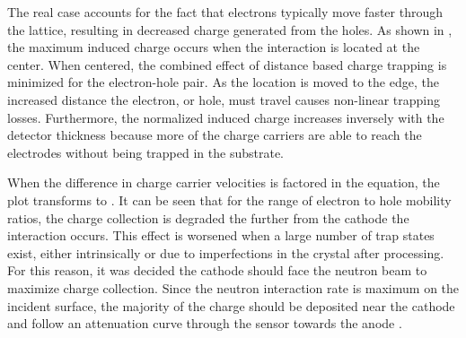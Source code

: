\documentclass[../../../main.tex]{subfiles}
\begin{document}
    The real case accounts for the fact that electrons typically move faster through the lattice, resulting in decreased charge generated from the holes. 
    As shown in , the maximum induced charge occurs when the interaction is located at the center.
    When centered, the combined effect of distance based charge trapping is minimized for the electron-hole pair.
    As the location is moved to the edge, the increased distance the electron, or hole, must travel causes non-linear trapping losses.
    Furthermore, the normalized induced charge increases inversely with the detector thickness because more of the charge carriers are able to reach the electrodes without being trapped in the substrate.
    \par%
    When the difference in charge carrier velocities is factored in the equation, the plot transforms to .
    It can be seen that for the range of electron to hole mobility ratios, the charge collection is degraded the further from the cathode the interaction occurs.
    This effect is worsened when a large number of trap states exist, either intrinsically or due to imperfections in the crystal after processing.
    For this reason, it was decided the cathode should face the neutron beam to maximize charge collection.
    Since the neutron interaction rate is maximum on the incident surface, the majority of the charge should be deposited near the cathode and follow an attenuation curve through the sensor towards the anode \cite{book:Knoll_2010}.
\end{document}
